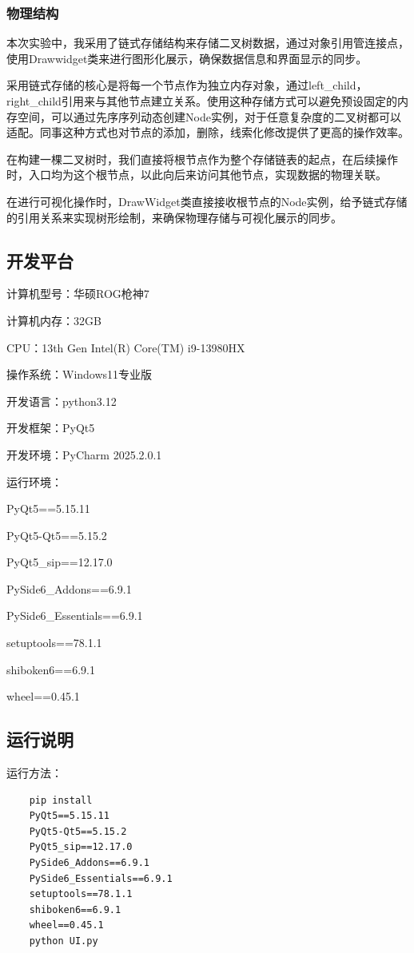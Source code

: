 \documentclass[12pt,a4paper]{article}
\begin{document}
\subsubsection{物理结构}

本次实验中，我采用了链式存储结构来存储二叉树数据，通过对象引用管连接点，使用Drawwidget类来进行图形化展示，确保数据信息和界面显示的同步。

采用链式存储的核心是将每一个节点作为独立内存对象，通过left\_child，right\_child引用来与其他节点建立关系。使用这种存储方式可以避免预设固定的内存空间，可以通过先序序列动态创建Node实例，对于任意复杂度的二叉树都可以适配。同事这种方式也对节点的添加，删除，线索化修改提供了更高的操作效率。

在构建一棵二叉树时，我们直接将根节点作为整个存储链表的起点，在后续操作时，入口均为这个根节点，以此向后来访问其他节点，实现数据的物理关联。

在进行可视化操作时，DrawWidget类直接接收根节点的Node实例，给予链式存储的引用关系来实现树形绘制，来确保物理存储与可视化展示的同步。

\subsection{开发平台}

计算机型号：华硕ROG枪神7

计算机内存：32GB

CPU：13th Gen Intel(R) Core(TM) i9-13980HX

操作系统：Windows11专业版

开发语言：python3.12

开发框架：PyQt5

开发环境：PyCharm 2025.2.0.1

运行环境：

PyQt5==5.15.11

PyQt5-Qt5==5.15.2

PyQt5\_sip==12.17.0

PySide6\_Addons==6.9.1

PySide6\_Essentials==6.9.1

setuptools==78.1.1

shiboken6==6.9.1

wheel==0.45.1

\subsection{运行说明}

运行方法：
\begin{verbatim}
    pip install 
    PyQt5==5.15.11
    PyQt5-Qt5==5.15.2
    PyQt5_sip==12.17.0
    PySide6_Addons==6.9.1
    PySide6_Essentials==6.9.1
    setuptools==78.1.1
    shiboken6==6.9.1
    wheel==0.45.1
    python UI.py
\end{verbatim}
\end{document}
